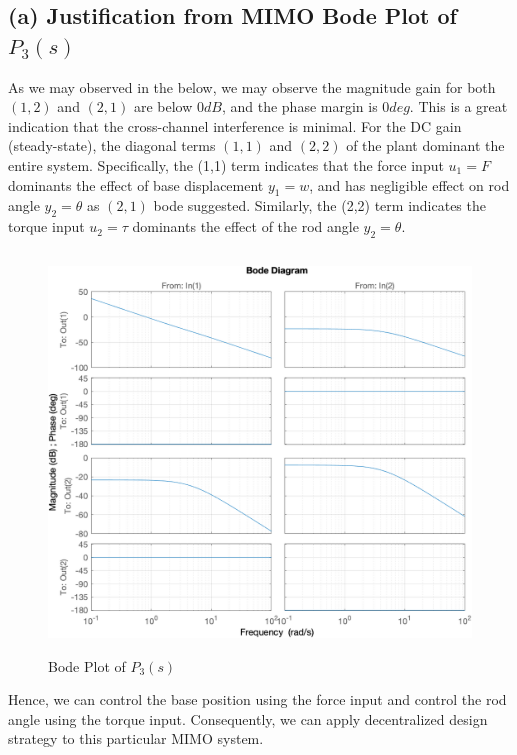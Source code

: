 \documentclass{tron}
\begin{document}
\subsection{(a) Justification from MIMO Bode Plot of $P_3(s)$ \label{ans:P5-a}}

As we may observed in the  below, we may observe the magnitude gain for both $(1,2)$ and $(2,1)$ are below $0\unit{dB}$, and the phase margin is $0 \unit{deg}$. This is a great indication that the cross-channel interference is minimal. For the DC gain (steady-state), the diagonal terms $(1,1)$ and $(2,2)$ of the plant dominant the entire system. Specifically, the (1,1) term indicates that the force input $u_1 = F$ dominants the effect of base displacement $y_1 = w$, and has negligible effect on rod angle $y_2 = \theta$ as $(2, 1)$ bode suggested. Similarly, the (2,2) term indicates the torque input $u_2 = \tau$ dominants the effect of the rod angle $y_2 = \theta$. 

\begin{figure}[H]
	\centering
	\includegraphics[height=400px]{../matlab/output/p5/P3_bode_plot}
	\caption{Bode Plot of $P_3(s)$}
	\label{fig:p5:P3:bode}
\end{figure}

Hence, we can control the base position using the force input and control the rod angle using the torque input. Consequently, we can apply decentralized design strategy to this particular MIMO system. 

\clearpage
\end{document}
